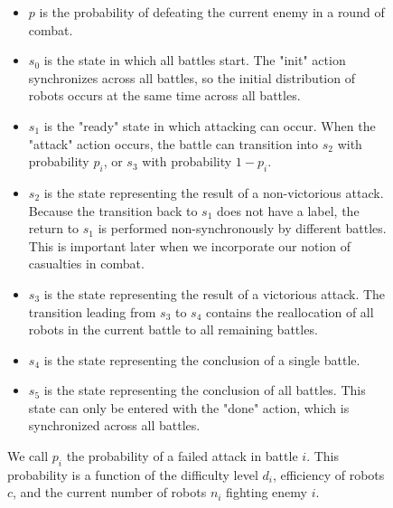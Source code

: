 \documentclass[11pt]{article}
\theoremstyle{definition}
\begin{document}
\begin{figure}
    \begin{itemize}
        \item $ p $ is the probability of defeating the current
            enemy in a round of combat.
        \item $ s_0 $ is the state in which all battles start.
            The "init" action synchronizes across all
            battles, so the initial
            distribution of robots occurs at the same time
            across all battles.
        \item $ s_1 $ is the "ready" state in which
            attacking can occur. When the "attack" action
            occurs, the battle can transition into
            $ s_2 $ with probability $ p_i $, or
            $ s_3 $ with probability $ 1 - p_i $.
        \item $ s_2 $ is the state representing the result
            of a non-victorious attack. Because
            the transition back to $ s_1 $ does not
            have a label, the return to $ s_1 $ is
            performed non-synchronously by different battles.
            This is important later when we incorporate
            our notion of casualties in combat.
        \item $ s_3 $ is the state representing the result
            of a victorious attack. The transition
            leading from $ s_3 $ to $ s_4 $ contains
            the reallocation of all robots in the
            current battle to all remaining battles.
        \item $ s_4 $ is the state representing the
            conclusion of a single battle.
        \item $ s_5 $ is the state representing the
            conclusion of all battles. This state
            can only be entered with the "done" action,
            which is synchronized across all battles.
    \end{itemize}

    We call $ p_i $ the probability of a failed
    attack in battle $ i $. This probability
    is a function of the difficulty level $ d_i $,
    efficiency of robots $ c $, and
    the current number of robots $ n_i $ fighting
    enemy $ i $.
\end{figure}
\end{document}
